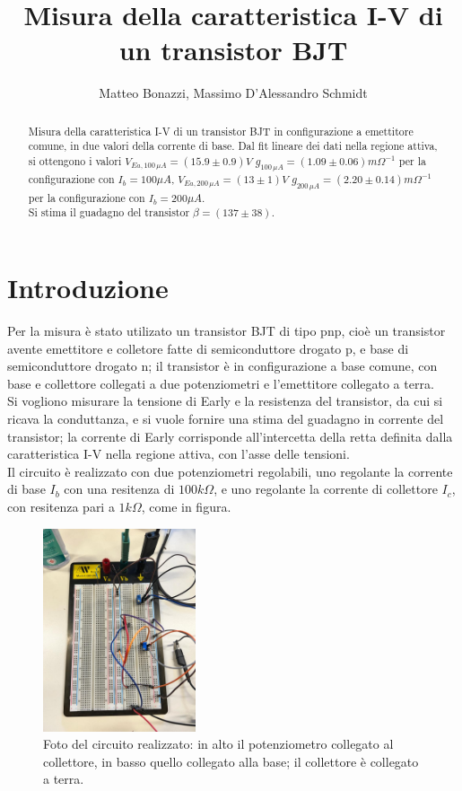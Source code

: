 \documentclass{article}
\title{Misura della caratteristica I-V di un transistor BJT}
\author{Matteo Bonazzi, Massimo D'Alessandro Schmidt}
\begin{document}
\maketitle
\begin{abstract}
    Misura della caratteristica I-V di un transistor BJT in configurazione a emettitore comune, in due valori della corrente di base.\newline
    Dal fit lineare dei dati nella regione attiva, si ottengono i valori $V_{Ea,100\,\mu A}=(15.9\pm 0.9) V$ $g_{100\,\mu A}=(1.09 \pm 0.06) m\Omega^{-1} $ per la configurazione con $I_b=100 \mu A$, $V_{Ea,200\,\mu A}=(13\pm 1) V $ $g_{200\,\mu A}=(2.20 \pm 0.14) m\Omega^{-1}$ per la configurazione con $I_b=200 \mu A$.\\
    Si stima il guadagno del transistor $\beta=(137\pm38)$.\\
\end{abstract}

\section{Introduzione}
Per la misura è stato utilizato un transistor BJT di tipo pnp, cioè un transistor avente emettitore e colletore fatte di semiconduttore drogato p, e base di semiconduttore drogato n; il transistor è in configurazione a base comune, con base
e collettore collegati a due potenziometri e l'emettitore collegato a terra.\\
Si vogliono misurare la tensione di Early e la resistenza del transistor, da cui si ricava la conduttanza, e si vuole fornire una stima del guadagno in corrente del transistor;
la corrente di Early corrisponde all'intercetta della retta definita dalla caratteristica I-V nella regione attiva, con l'asse delle tensioni.\\
Il circuito è realizzato con due potenziometri regolabili, uno regolante la corrente di base $I_b$ con una resitenza di $100k\Omega$, e uno regolante
la corrente di collettore $I_c$, con resitenza pari a $1k\Omega$, come in figura.

\begin{figure}[tb]
    \centering
    \includegraphics[width=0.4\textwidth]{circuito.jpg}
    \caption{\centering\label{fig:circuito}Foto del circuito realizzato: in alto il potenziometro collegato al collettore, in basso quello collegato alla base; il collettore è collegato a terra.}
\end{figure}
\end{document}
